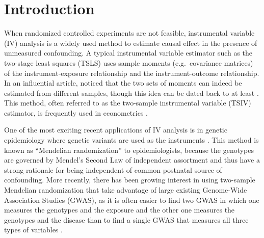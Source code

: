 \documentclass[preprint]{imsart}
\begin{document}
\begin{frontmatter}
  \begin{keyword}
  \end{keyword}

\end{frontmatter}

\section{Introduction}
\label{sec:introduction}

When randomized controlled experiments are not feasible, instrumental
variable (IV) analysis is a widely used method to estimate causal
effect in the presence of unmeasured confounding. A typical instrumental
variable estimator such as the two-stage least squares (TSLS) uses
sample moments (e.g.\ covariance matrices) of the instrument-exposure
relationship and the instrument-outcome relationship. In an
influential article, \citet{angrist1992effect} noticed that the two
sets of moments can indeed be estimated from different samples, though
this idea can be dated back to at least
\citet{klevmarken1982missing}. This
method, often referred to as the two-sample instrumental variable
(TSIV) estimator, is frequently used in econometrics
\citep{inoue2010two}.

One of the most exciting recent applications of IV analysis is
in genetic epidemiology where genetic variants are used as the
instruments
\citep{davey2003mendelian,lawlor2008mendelian,burgess2015review}. This
method is known as ``Mendelian randomization'' to epidemiologists,
because the genotypes are governed by Mendel's Second Law of
independent assortment and thus have a strong rationale for being
independent of common postnatal source of
confounding. More recently, there has been growing interest in using
two-sample Mendelian randomization that take advantage of large existing
Genome-Wide Association Studies (GWAS), as it is often easier to
find two GWAS in which one measures the genotypes
and the exposure and the other one measures the genotypes and the
disease than to find a single GWAS that measures all three types of
variables
\citep{pierce2013efficient,davey2014mendelian,burgess2015using,gamazon2015gene,lawlor2016commentary}.
\end{document}
